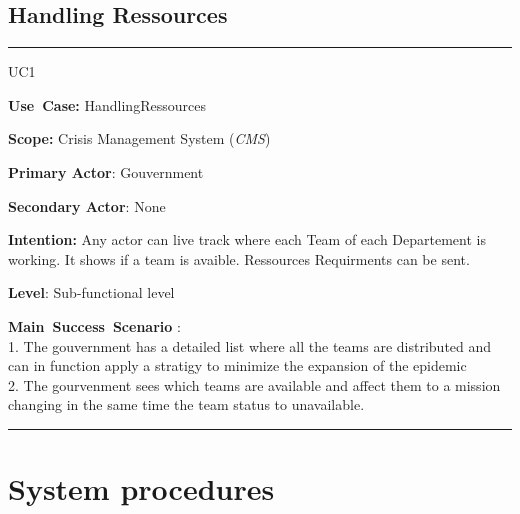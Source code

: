 \subsection{Handling Ressources}
\vspace{0.5cm}
\hrule
\vspace{0.5cm}
\begin{lyxlist}{UC1}
\small{
\item [\textbf{Use~Case:}] HandlingRessources
\item [\textbf{Scope:}] Crisis Management System (\emph{CMS})
\item [\textbf{Primary Actor}:] Gouvernment
\item [\textbf{Secondary Actor}:] None
\item [\textbf{Intention:}]Any actor can live track where each Team of each
Departement is working. It shows if a team is avaible. Ressources Requirments
can be sent.
\item [\textbf{Level}:]Sub-functional level
\item [\textbf{Main~Success~Scenario}]:\\
1. The gouvernment has a detailed list where all the teams are distributed and
can in function apply a stratigy to minimize the expansion of the epidemic\\
2. The gourvenment sees which teams are available and affect them to a
mission changing in the same time the team status to unavailable.\\

}
\end{lyxlist}
\hrule
\vspace{0.5cm} 

\section{System procedures}

